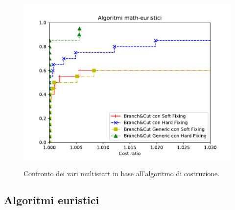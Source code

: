 \begin{figure}[h] 
\begin{center} 
  \includegraphics[scale=0.8]{Images/pp_math-heuristic_zoom}\\ 
  \caption{\footnotesize{Confronto dei vari multistart in base all'algoritmo di costruzione.}}
  \label{perf_profile} 
\end{center} 
\end{figure}

\subsection{Algoritmi euristici}
